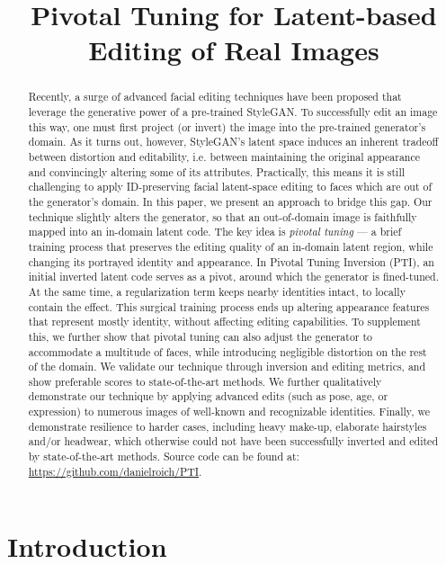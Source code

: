 \title{Pivotal Tuning for Latent-based Editing of Real Images}

\begin{abstract}
Recently, a surge of advanced facial editing techniques have been proposed that leverage the generative power of a pre-trained StyleGAN. To successfully edit an image this way, one must first project (or invert) the image into the pre-trained generator's domain. As it turns out, however, StyleGAN's latent space induces an inherent tradeoff between distortion and editability, i.e. between maintaining the original appearance and convincingly altering some of its attributes. Practically, this means it is still challenging to apply ID-preserving facial latent-space editing to faces which are out of the generator's domain. In this paper, we present an approach to bridge this gap. Our technique slightly alters the generator, so that an out-of-domain image is faithfully mapped into an in-domain latent code. The key idea is \textit{pivotal tuning} --- a brief training process that preserves the editing quality of an in-domain latent region, while changing its portrayed identity and appearance. In Pivotal Tuning Inversion (PTI), an initial inverted latent code serves as a pivot, around which the generator is fined-tuned. At the same time, a regularization term keeps nearby identities intact, to locally contain the effect. This surgical training process ends up altering appearance features that represent mostly identity, without affecting editing capabilities. To supplement this, we further show that pivotal tuning can also adjust the generator to accommodate a multitude of faces, while introducing negligible distortion on the rest of the domain. We validate our technique through inversion and editing metrics, and show preferable scores to state-of-the-art methods. We further qualitatively demonstrate our technique by applying advanced edits (such as pose, age, or expression) to numerous images of well-known and recognizable identities. Finally, we demonstrate resilience to harder cases, including heavy make-up, elaborate hairstyles and/or headwear, which otherwise could not have been successfully inverted and edited by state-of-the-art methods. Source code can be found at: \url{https://github.com/danielroich/PTI}.

\quad
\end{abstract}

\section{Introduction}

